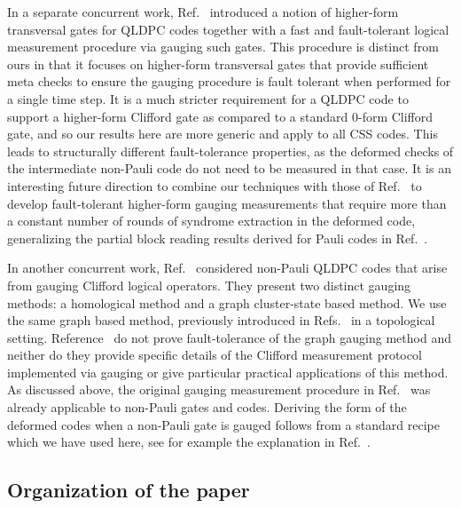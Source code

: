 \documentclass[11pt]{article}
\begin{document}
In a separate concurrent work, Ref.~\cite{williamson2026fast} introduced a notion of higher-form transversal gates for QLDPC codes together with a fast and fault-tolerant logical measurement procedure via gauging such gates. This procedure is distinct from ours in that it focuses on higher-form transversal gates that provide sufficient meta checks to ensure the gauging procedure is fault tolerant when performed for a single time step. It is a much stricter requirement for a QLDPC code to support a higher-form Clifford gate as compared to a standard 0-form Clifford gate, and so our results here are more generic and apply to all CSS codes. This leads to structurally different fault-tolerance properties, as the deformed checks of the intermediate non-Pauli code do not need to be measured in that case. It is an interesting future direction to combine our techniques with those of Ref.~\cite{williamson2026fast} to develop fault-tolerant higher-form gauging measurements that require more than a constant number of rounds of syndrome extraction in the deformed code, generalizing the partial block reading results derived for Pauli codes in Ref.~\cite{cowtan2025fast}. 

In another concurrent work, Ref.~\cite{christos2026nonabelianquantumlowdensityparity} considered non-Pauli QLDPC codes that arise from gauging Clifford logical operators. They present two distinct gauging methods: a homological method and a graph cluster-state based method. We use the same graph based method, previously introduced in Refs.~\cite{Williamson_2021,Tantivasadakarn_2024,verresen2022efficientlypreparingschrodingerscat,Tantivasadakarn_2023} in a topological setting. Reference~\cite{christos2026nonabelianquantumlowdensityparity} do not prove fault-tolerance of the graph gauging method and neither do they provide specific details of the Clifford measurement protocol implemented via gauging or give particular practical applications of this method. As discussed above, the original gauging measurement procedure in Ref.~\cite{williamson2024lowoverheadfaulttolerantquantumcomputation} was already applicable to non-Pauli gates and codes. Deriving the form of the deformed codes when a non-Pauli gate is gauged follows from a standard recipe which we have used here, see for example the explanation in Ref.~\cite{Bulmash_2019,Prem_2019,verresen2022efficientlypreparingschrodingerscat}. 


\subsection{Organization of the paper}
\end{document}
